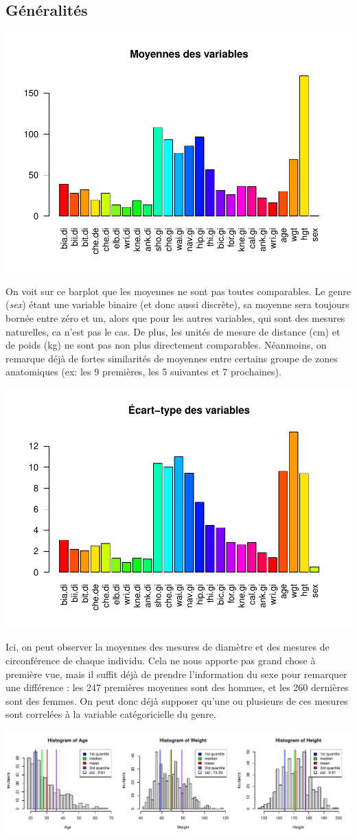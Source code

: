 \documentclass[
]{article}
\begin{document}
\hypertarget{guxe9nuxe9ralituxe9s}{%
\subsection{Généralités}\label{guxe9nuxe9ralituxe9s}}

\begin{center}\includegraphics[width=0.33\linewidth]{Template_files/figure-latex/unnamed-chunk-2-1} \end{center}

On voit sur ce barplot que les moyennes ne sont pas toutes comparables.
Le genre (\emph{sex}) étant une variable binaire (et donc aussi
discrète), sa moyenne sera toujours bornée entre zéro et un, alors que
pour les autres variables, qui sont des mesures naturelles, ca n'est pas
le cas. De plus, les unités de mesure de distance (cm) et de poids (kg)
ne sont pas non plus directement comparables. Néanmoins, on remarque
déjà de fortes similarités de moyennes entre certains groupe de zones
anatomiques (ex: les 9 premières, les 5 suivantes et 7 prochaines).

\begin{center}\includegraphics[width=0.33\linewidth]{Template_files/figure-latex/unnamed-chunk-3-1} \end{center}

Ici, on peut observer la moyennes des mesures de diamètre et des mesures
de circonférence de chaque individu. Cela ne nous apporte pas grand
chose à première vue, mais il suffit déjà de prendre l'information du
sexe pour remarquer une différence : les 247 premières moyennes sont des
hommes, et les 260 dernières sont des femmes. On peut donc déjà supposer
qu'une ou plusieurs de ces mesures sont correlées à la variable
catégoricielle du genre.

\begin{center}\includegraphics[width=0.33\linewidth]{Template_files/figure-latex/unnamed-chunk-4-1} \end{center}
\end{document}
